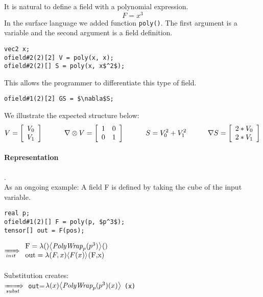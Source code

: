
It is natural to define a field with a polynomial expression. $$F = x^3$$
In the surface language we added function \lstinline[mathescape=true]!poly()!.
The first argument is a variable and the second argument is a field definition.
\begin{lstlisting}[mathescape=true]
vec2 x;
ofield#2(2)[2] V = poly(x, x);
ofield#2(2)[] S = poly(x, x$^2$);
\end{lstlisting}
This allows the programmer to differentiate this type of field.
\begin{lstlisting}[mathescape=true]
ofield#1(2)[2] GS = $\nabla$S;
\end{lstlisting}
We illustrate the expected structure below:
\begin{displaymath}
  V=\left[ \begin{array}{ll}
  V_0 \\  V_1  \\
  \end{array}
 \right]   \indent\indent 
  \nabla \otimes V=\left[ \begin{array}{ll}
 1&   0 \\  0  &  1  \\
  \end{array}
 \right]   \indent\indent 
   S=  V_0 ^2+  V_1^2  \\
  \indent\indent
    \nabla S=\left[ \begin{array}{ll}
  2*V_0 \\  2*V_1  \\
  \end{array}
 \right] 
 \end{displaymath}

\paragraph{Representation}.\\
As an ongoing example:
A field F is defined by taking the cube of the input variable.\begin{lstlisting}[mathescape=true]
real p; 
ofield#1(2)[] F = poly(p, $p^3$);
tensor[] out = F(pos);
\end{lstlisting}

$\rewriteInitA \begin{array}{ll} \lstinline[mathescape=true]!F!=\lambda ()\EinExp{\expPolyWrap{p}{{p}^3}}{}()\\
\lstinline[mathescape=true]!out!=\lambda(F,x) \EinExp{F(x)}{}\lstinline[mathescape=true]!(F,x)!\end{array}$\\
\\
Substitution creates:\\
$\xRightarrow[subst]{}{}$ \lstinline[mathescape=true]!out!=$\lambda(x) {\left\langle{\textit{PolyWrap}_{p}({p^3})(x)}\right\rangle}_{}$
\lstinline[mathescape=true]!(x)!
